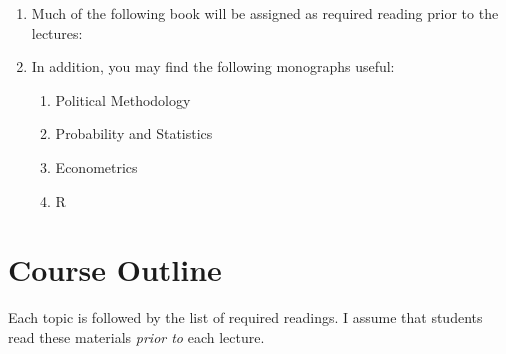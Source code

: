\documentclass[11pt]{article}
\begin{document}
\begin{enumerate}
\item Much of the following book will be assigned as required reading
  prior to the lectures:
   \begin{bibunit}[unsrtnat]
     \nocite{free:05}
      \putbib[my]
    \end{bibunit}


  \item In addition, you may find the following monographs useful:
    \begin{enumerate}
    \item Political Methodology
   \begin{bibunit}[unsrtnat]
     \nocite{king:98}
      \putbib[my]
    \end{bibunit}

    \item Probability and Statistics
   \begin{bibunit}[unsrtnat]
     \nocite{wass:05}
      \putbib[my]
    \end{bibunit}

    \item Econometrics
   \begin{bibunit}[unsrtnat]
     \nocite{wool:02}
      \putbib[my]
    \end{bibunit}

    \item R
   \begin{bibunit}[unsrtnat]
     \nocite{fox:02}
      \putbib[my]
    \end{bibunit}
    \end{enumerate}
\end{enumerate}

\section{Course Outline}

Each topic is followed by the list of required readings.  I assume
that students read these materials {\it prior to} each lecture.
\end{document}
